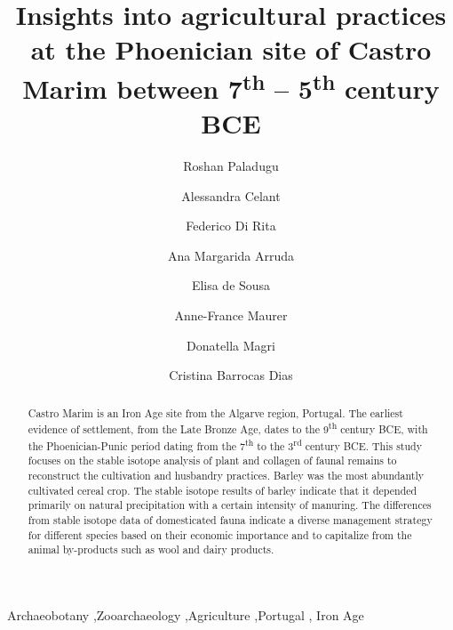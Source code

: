 \documentclass[preprint, 3p, authoryear]{elsarticle} %
\begin{document}
\begin{frontmatter}

  \title{Insights into agricultural practices at the Phoenician site of Castro Marim between 7\textsuperscript{th} -- 5\textsuperscript{th} century BCE}
    \author[Universidade de Évora,Laboratório HERCULES,Sapienza Università di Roma]{Roshan Paladugu%
  }
    \author[Sapienza Università di Roma]{Alessandra Celant%
  }
    \author[Sapienza Università di Roma]{Federico Di Rita%
  }
    \author[Universidade de Lisboa]{Ana Margarida Arruda%
  }
    \author[Universidade de Lisboa]{Elisa de Sousa%
  }
    \author[Universidade de Évora,Laboratório HERCULES]{Anne-France Maurer%
  }
    \author[Sapienza Università di Roma]{Donatella Magri%
  }
    \author[Universidade de Évora,Laboratório HERCULES]{Cristina Barrocas Dias%
  }
  
  \begin{abstract}
  Castro Marim is an Iron Age site from the Algarve region, Portugal. The earliest evidence of settlement, from the Late Bronze Age, dates to the 9\textsuperscript{th} century BCE, with the Phoenician-Punic period dating from the 7\textsuperscript{th} to the 3\textsuperscript{rd} century BCE. This study focuses on the stable isotope analysis of plant and collagen of faunal remains to reconstruct the cultivation and husbandry practices. Barley was the most abundantly cultivated cereal crop. The stable isotope results of barley indicate that it depended primarily on natural precipitation with a certain intensity of manuring. The differences from stable isotope data of domesticated fauna indicate a diverse management strategy for different species based on their economic importance and to capitalize from the animal by-products such as wool and dairy products.
  \end{abstract}
    \begin{keyword}
    Archaeobotany \sep Zooarchaeology \sep Agriculture \sep Portugal \sep 
    Iron Age
  \end{keyword}
  
 \end{frontmatter}
\end{document}
